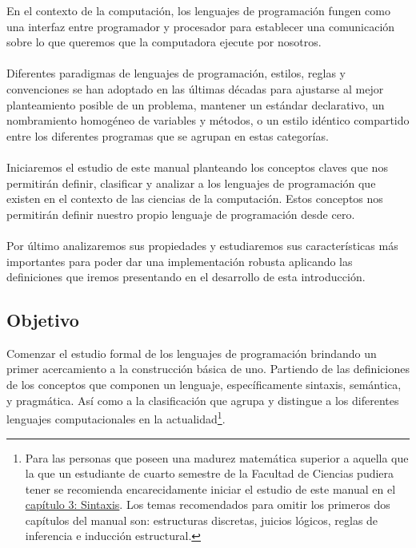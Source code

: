 En el contexto de la computación, los lenguajes de programación fungen como una interfaz entre programador y procesador para establecer una comunicación sobre lo que queremos que la computadora ejecute por nosotros.\\\\
Diferentes paradigmas de lenguajes de programación, estilos, reglas y convenciones se han adoptado en las últimas décadas para ajustarse al mejor planteamiento posible de un problema, mantener un estándar declarativo, un nombramiento homogéneo de variables y métodos, o un estilo idéntico compartido entre los diferentes programas que se agrupan en estas categorías.\\\\
Iniciaremos el estudio de este manual planteando los conceptos claves que nos permitirán definir, clasificar y analizar a los lenguajes de programación que existen en el contexto de las ciencias de la computación. Estos conceptos nos permitirán definir nuestro propio lenguaje de programación desde cero.\\\\
Por último analizaremos sus propiedades y estudiaremos sus características más importantes para poder dar una implementación robusta aplicando las definiciones que iremos presentando en el desarrollo de esta introducción.\\

\subsection*{Objetivo}
    Comenzar el estudio formal de los lenguajes de programación brindando un primer acercamiento a la construcción básica de uno. Partiendo de las definiciones de los conceptos que componen un lenguaje, específicamente sintaxis, semántica, y pragmática. Así como a la clasificación que agrupa y distingue a los diferentes lenguajes computacionales en la actualidad\footnote{Para las personas que poseen una madurez matemática superior a aquella que la que un estudiante de cuarto semestre de la Facultad de Ciencias pudiera tener se recomienda encarecidamente iniciar el estudio de este manual en el \hyperref[sec:sintax]{capítulo 3: Sintaxis}. Los temas recomendados para omitir los primeros dos capítulos del manual son: estructuras discretas, juicios lógicos, reglas de inferencia e inducción estructural. }.

